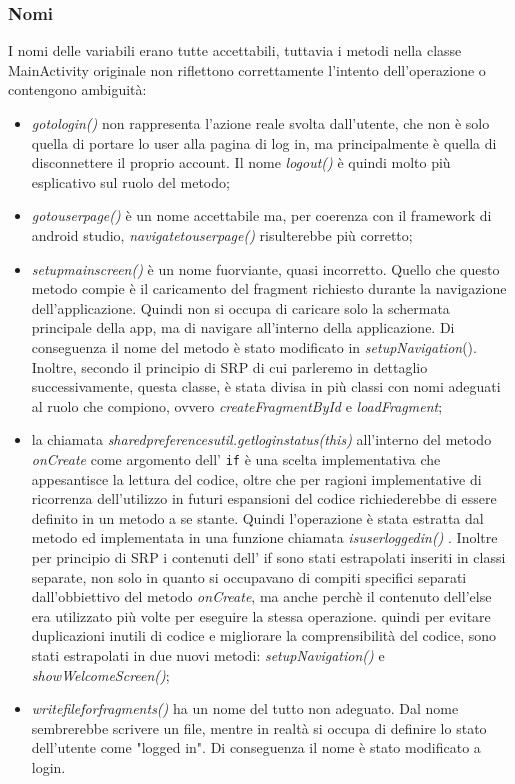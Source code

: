 \subsubsection{Nomi}
I nomi delle variabili erano tutte accettabili, tuttavia i metodi nella classe MainActivity originale non riflettono correttamente l'intento dell'operazione o contengono ambiguità:
\begin{itemize}
    \item     \textit{gotologin()} non rappresenta l'azione reale svolta dall'utente, che non è solo quella di portare lo user alla pagina di log in, ma principalmente è quella di disconnettere il proprio account. Il nome \textit{logout()} è quindi molto più esplicativo sul ruolo del metodo;
    \item \textit{gotouserpage()} è un nome accettabile ma, per coerenza con il framework di android studio, \textit{navigatetouserpage()} risulterebbe più corretto;
    \item \textit{setupmainscreen()} è un nome fuorviante, quasi incorretto. Quello che questo metodo compie è il caricamento del fragment richiesto durante la navigazione dell'applicazione. Quindi non si occupa di caricare solo la schermata principale della app, ma di navigare all'interno della applicazione. Di conseguenza il nome del metodo è stato modificato in \textit{setupNavigation}(). Inoltre, secondo il principio di SRP di cui parleremo in dettaglio successivamente, questa classe, è stata divisa in più classi con nomi adeguati al ruolo che compiono, ovvero \textit{createFragmentById} e \textit{loadFragment};
    \item     la chiamata \textit{sharedpreferencesutil.getloginstatus(this)} all'interno del metodo \textit{onCreate} come argomento dell' \texttt{if} è una scelta implementativa che appesantisce la lettura del codice, oltre che per ragioni implementative di ricorrenza dell'utilizzo in futuri espansioni del codice richiederebbe di essere definito in un metodo a se stante. Quindi l'operazione è stata estratta dal metodo ed implementata in una funzione chiamata \textit{isuserloggedin()} . Inoltre per principio di SRP i contenuti dell' if sono stati estrapolati inseriti in classi separate, non solo in quanto si occupavano di compiti specifici separati dall'obbiettivo del metodo \textit{onCreate}, ma anche perchè il contenuto dell'else era utilizzato più volte per eseguire la stessa operazione. quindi per evitare duplicazioni inutili di codice e migliorare la comprensibilità del codice, sono stati estrapolati in due nuovi metodi: \textit{ setupNavigation()} e  \textit{showWelcomeScreen()};
    \item \textit{writefileforfragments()} ha un nome del tutto non adeguato. Dal nome sembrerebbe scrivere un file, mentre in realtà si occupa di definire lo stato dell'utente come "logged in". Di conseguenza il nome è stato modificato a login. 
\end{itemize}


